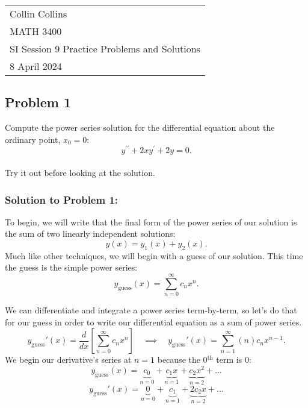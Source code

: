 \documentclass[a4paper,12pt]{article} %
\begin{document}



\thispagestyle{empty} %

\begin{tabular}{p{15.5cm}} %
\\ Collin Collins \\
MATH 3400\\
SI Session 9 Practice Problems and Solutions\\
8 April 2024 \\
\hline %

\end{tabular} 

\subsection*{Problem 1} Compute the power series solution for the differential equation about the ordinary point, $x_{0}=0$:
$$y^{\prime \prime}+2 x y^{\prime}+2 y=0. $$
\\
 
Try it out before looking at the solution.
\pagebreak
 
 \subsubsection*{Solution to Problem 1:}
 To begin, we will write that the final form of the power series of our solution is the sum of two linearly independent solutions:
 $$ y(x) = y_1(x) + y_2(x). $$
Much like other techniques, we will begin with a guess of our solution. This time the guess is the simple power series:
$$ y_{\text{guess}}(x) = \sum_{n=0}^{\infty} c_nx^n. $$

We can differentiate and integrate a power series term-by-term, so let's do that for our guess in order to write our differential equation as a sum of power series.
$$ y_{\text{guess}}'(x) = \frac{d}{dx}\left[\sum_{n=0}^{\infty} c_nx^n\right] \quad\implies\quad y_{\text{guess}}'(x) = \sum_{n=1}^{\infty} (n)c_nx^{n-1}. $$
We begin our derivative's series at $n=1$ because the 0$^{\text{th}}$ term is 0:
$$ y_{\text{guess}}(x) = \underbrace{c_0}_{n=0} + \underbrace{c_1x}_{n=1} + \underbrace{c_2x^2}_{n=2}+\ldots $$
$$ y_{\text{guess}}'(x) = \underbrace{0}_{n=0} + \underbrace{c_1}_{n=1} + \underbrace{2c_2x}_{n=2} +\ldots $$
\end{document}
